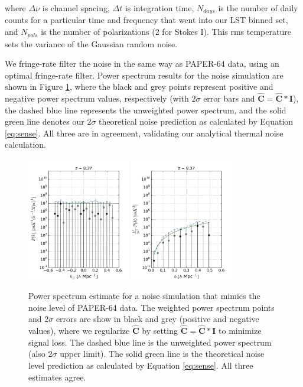 \documentclass[preprint2,numberedappendix,tighten]{aastex6}  %
\begin{document}
\noindent where $\Delta\nu$ is channel spacing, $\Delta t$ is integration time, $N_{days}$ is the number of daily counts for a particular time and frequency that went into our LST binned set, and $N_{pols}$ is the number of polarizations ($2$ for Stokes I). This rms temperature sets the variance of the Gaussian random noise.

We fringe-rate filter the noise in the same way as PAPER-64 data, using an optimal fringe-rate filter. Power spectrum results for the noise simulation are shown in Figure \ref{fig:ps_noise}, where the black and grey points represent positive and negative power spectrum values, respectively (with $2\sigma$ error bars and $\hat{\textbf{C}} = \hat{\textbf{C}} * \textbf{I}$), the dashed blue line represents the unweighted power spectrum, and the solid green line denotes our $2\sigma$ theoretical noise prediction as calculated by Equation \ref{eq:sense}. All three are in agreement, validating our analytical thermal noise calculation. 

\begin{figure}
	\centering
	\includegraphics[width=0.4\textwidth]{plots/ps1_noise_reg.png}
	\includegraphics[width=0.4\textwidth]{plots/ps2_noise_reg.png}
	\caption{Power spectrum estimate for a noise simulation that mimics the noise level of PAPER-64 data. The weighted power spectrum points and $2\sigma$ errors are show in black and grey (positive and negative values), where we regularize $\hat{\textbf{C}}$ by setting $\hat{\textbf{C}} = \hat{\textbf{C}} * \textbf{I}$ to minimize signal loss. The dashed blue line is the unweighted power spectrum (also $2\sigma$ upper limit). The solid green line is the theoretical noise level prediction as calculated by Equation \ref{eq:sense}. All three estimates agree.}
	\label{fig:ps_noise}
\end{figure}
\end{document}
